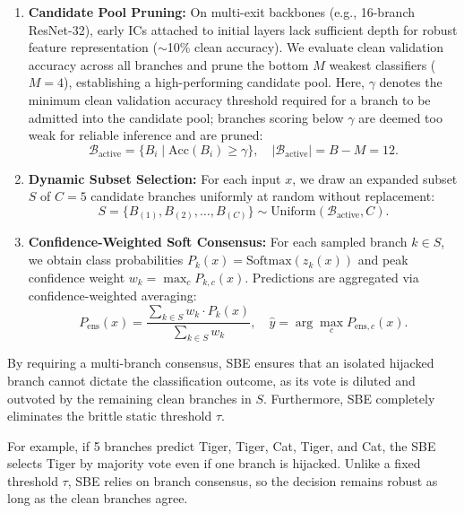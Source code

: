 \documentclass[conference,10pt]{IEEEtran}
\begin{document}
\begin{enumerate}
    \item \textbf{Candidate Pool Pruning:} On multi-exit backbones (e.g., 16-branch ResNet-32), early ICs attached to initial layers lack sufficient depth for robust feature representation ($\sim$10\% clean accuracy). We evaluate clean validation accuracy across all branches and prune the bottom $M$ weakest classifiers ($M = 4$), establishing a high-performing candidate pool. Here, $\gamma$ denotes the minimum clean validation accuracy threshold required for a branch to be admitted into the candidate pool; branches scoring below $\gamma$ are deemed too weak for reliable inference and are pruned:
    \begin{equation}
        \mathcal{B}_{\text{active}} = \{B_i \mid \text{Acc}(B_i) \ge \gamma\}, \quad |\mathcal{B}_{\text{active}}| = B - M = 12.
    \end{equation}
    \item \textbf{Dynamic Subset Selection:} For each input $x$, we draw an expanded subset $S$ of $C = 5$ candidate branches uniformly at random without replacement:
    \begin{equation}
        S = \{B_{(1)}, B_{(2)}, \dots, B_{(C)}\} \sim \text{Uniform}(\mathcal{B}_{\text{active}}, C).
    \end{equation}
    \item \textbf{Confidence-Weighted Soft Consensus:} For each sampled branch $k \in S$, we obtain class probabilities $P_k(x) = \text{Softmax}(z_k(x))$ and peak confidence weight $w_k = \max_c P_{k, c}(x)$. Predictions are aggregated via confidence-weighted averaging:
    \begin{equation}
        P_{\text{ens}}(x) = \frac{\sum_{k \in S} w_k \cdot P_k(x)}{\sum_{k \in S} w_k}, \quad \hat{y} = \arg\max_{c} P_{\text{ens}, c}(x).
    \end{equation}
\end{enumerate}
By requiring a multi-branch consensus, SBE ensures that an isolated hijacked branch cannot dictate the classification outcome, as its vote is diluted and outvoted by the remaining clean branches in $S$. Furthermore, SBE completely eliminates the brittle static threshold $\tau$. 

For example, if 5 branches predict Tiger, Tiger, Cat, Tiger, and Cat, the SBE selects Tiger by majority vote even if one branch is hijacked. Unlike a fixed threshold $\tau$, SBE relies on branch consensus, so the decision remains robust as long as the clean branches agree.
\end{document}
